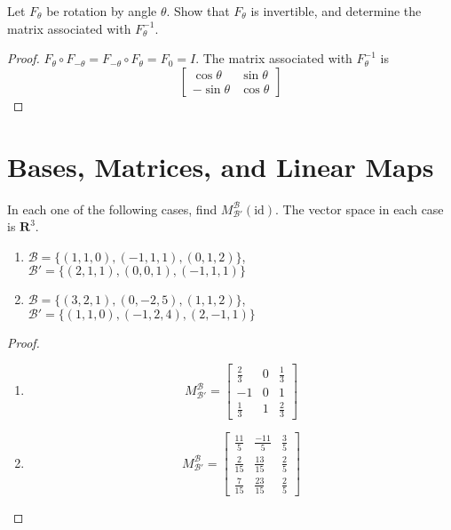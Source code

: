 \begin{exercise}
    Let $F_{\theta}$ be rotation by angle $\theta$. Show that $F_{\theta}$ is invertible, and determine the matrix associated with $F_{\theta}^{-1}$.
\end{exercise}

\begin{proof}
    $F_{\theta}\circ F_{-\theta} = F_{-\theta}\circ F_{\theta} = F_{0} = I$. The matrix associated with $F_{\theta}^{-1}$ is
    \[
        \begin{bmatrix}
            \cos\theta  & \sin\theta \\
            -\sin\theta & \cos\theta
        \end{bmatrix}
    \]
\end{proof}

\section{Bases, Matrices, and Linear Maps}
\setcounter{exercise}{0}

\begin{exercise}
    In each one of the following cases, find $M^{\mathscr{B}}_{\mathscr{B'}}(\text{id})$. The vector space in each case is $\mathbf{R}^{3}$.
    \begin{enumerate}[label={(\alph*)}]
        \item $\mathscr{B} = \{ (1, 1, 0), (-1, 1, 1), (0, 1, 2) \}$, $\mathscr{B'} = \{ (2, 1, 1), (0, 0, 1), (-1, 1, 1) \}$
        \item $\mathscr{B} = \{ (3, 2, 1), (0, -2, 5), (1, 1, 2) \}$, $\mathscr{B'} = \{ (1, 1, 0), (-1, 2, 4), (2, -1, 1) \}$
    \end{enumerate}
\end{exercise}

\begin{proof}
    \begin{enumerate}[label={(\alph*)}]
        \item \[
                  M^{\mathscr{B}}_{\mathscr{B'}} =
                  \begin{bmatrix}
                      \frac{2}{3} & 0 & \frac{1}{3} \\
                      -1          & 0 & 1           \\
                      \frac{1}{3} & 1 & \frac{2}{3}
                  \end{bmatrix}
              \]
        \item \[
                  M^{\mathscr{B}}_{\mathscr{B'}} =
                  \begin{bmatrix}
                      \frac{11}{5} & \frac{-11}{5} & \frac{3}{5} \\
                      \frac{2}{15} & \frac{13}{15} & \frac{2}{5} \\
                      \frac{7}{15} & \frac{23}{15} & \frac{2}{5}
                  \end{bmatrix}
              \]
    \end{enumerate}
\end{proof}

